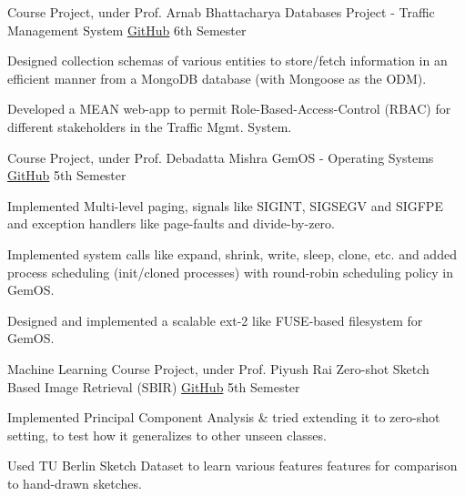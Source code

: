 \begin{cventries}
  \cventry
  {Course Project, under Prof. Arnab Bhattacharya}
  {Databases Project - Traffic Management System}
  {\href{https://github.com/mayanksha/cs315-traffic-mgmt/blob/master/report.pdf}{\faGithubSquare\acvHeaderIconSep GitHub}}
  {6th Semester}
  {
    \begin{cvitems}
    \item Designed collection schemas of various entities to store/fetch information in an efficient manner from a MongoDB database (with Mongoose as the ODM).
    \item Developed a MEAN web-app to permit Role-Based-Access-Control (RBAC) for different stakeholders in the Traffic Mgmt. System.
    \end{cvitems}
  }

  \cventry
  {Course Project, under Prof. Debadatta Mishra}
  {GemOS - Operating Systems}
  {\href{https://github.com/mayanksha/CS330}{\faGithubSquare\acvHeaderIconSep GitHub}}
  {5th Semester}
  {
    \begin{cvitems}
    \item Implemented Multi-level paging, signals like SIGINT, SIGSEGV and SIGFPE and exception handlers like page-faults and divide-by-zero.
    \item Implemented system calls like expand, shrink, write, sleep, clone, etc. and added process scheduling (init/cloned processes) with round-robin scheduling policy in GemOS.
    \item Designed and implemented a scalable ext-2 like FUSE-based filesystem for GemOS.
    \end{cvitems}
  }

  \cventry
  {Machine Learning Course Project, under Prof. Piyush Rai}
  {Zero-shot Sketch Based Image Retrieval (SBIR)}
  {\href{https://github.com/mayanksha/cs771/tree/master/Project}{\faGithubSquare\acvHeaderIconSep GitHub}}
  {5th Semester}
  {
    \begin{cvitems}
	\item Implemented Principal Component Analysis \& tried extending it to zero-shot setting, to test how it generalizes to other unseen classes.
    \item Used TU Berlin Sketch Dataset to learn various features features for comparison to hand-drawn sketches.
    \end{cvitems}
  }


\end{cventries}
